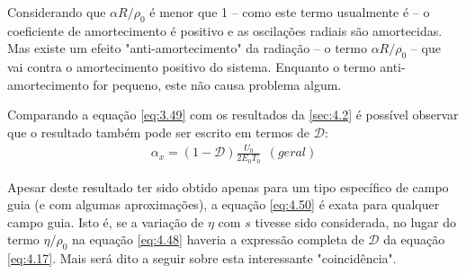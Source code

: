 Considerando que $\alpha R/\rho_0$ é menor que 1 -- como este termo usualmente é -- o coeficiente de amortecimento é positivo e as oscilações radiais são amortecidas. Mas existe um efeito "anti-amortecimento" da radiação -- o termo $\alpha R/\rho_0$ -- que vai contra o amortecimento positivo do sistema. Enquanto o termo anti-amortecimento for pequeno, este não causa problema algum.

Comparando a equação \eqref{eq:3.49} com os resultados da \autoref{sec:4.2} é possível observar que o resultado também pode ser escrito em termos de $\mathscr{D}$:
\begin{align}
	\alpha_x = (1-\mathscr{D})\frac{U_0}{2E_0T_0}\ \ (geral)\label{eq:4.50}
\end{align}

Apesar deste resultado ter sido obtido apenas para um tipo específico de campo guia (e com algumas aproximações), a equação \eqref{eq:4.50} é exata para qualquer campo guia. Isto é, se a variação de $\eta$ com $s$ tivesse sido considerada, no lugar do termo $\eta/\rho_0$ na equação \eqref{eq:4.48} haveria a expressão completa de $\mathscr{D}$ da equação \eqref{eq:4.17}. Mais será dito a seguir sobre esta interessante "coincidência".